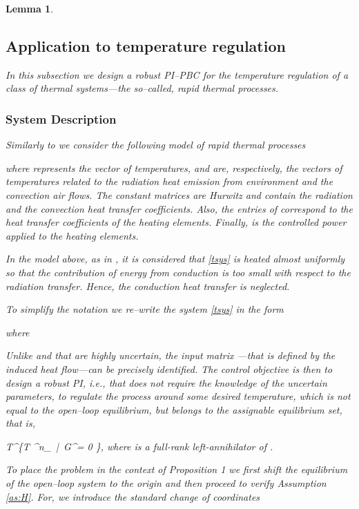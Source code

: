 \documentclass[10pt, conference]{ieeeconf}
\newtheorem{lemma}{Lemma}
\def\rea{\mathbb{R}}
\def\begequ{}
\def\lab{\label}
\begin{document}
\begin{lemma}
\subsection{Application to temperature regulation}
\lab{subsec62}	
In this subsection we design a robust PI--PBC for the temperature regulation of a class of thermal systems---the so--called, rapid thermal processes.
\subsubsection{System Description}
Similarly to \cite{ebert2004model, schaper1992modeling} we consider the following model of rapid thermal processes
 
where   represents the vector of temperatures,  and    are, respectively, the vectors of temperatures related to the radiation heat emission from environment and the convection air flows. 
The constant matrices   are {\em Hurwitz}  and contain the radiation and the convection heat transfer coefficients. Also, the entries of   correspond to the heat transfer coefficients of the heating elements. Finally,  is the controlled power applied to the heating elements. 

In the model above, as in \cite{schaper1992modeling}, it is considered that  \eqref{tsys}  is heated almost uniformly so that the contribution of energy from conduction is too small with respect to the radiation transfer. Hence, the conduction heat transfer is neglected. 

To simplify the notation we re--write the system \eqref{tsys} in the form 

where

Unlike   and  that are highly uncertain, the input matrix ---that is defined by the induced heat flow---can be precisely identified. The {\em control objective} is then to design a robust PI, {\em i.e.}, that does not require the knowledge of  the uncertain parameters, to regulate the process around some desired temperature, which is {\em not equal} to the open--loop equilibrium, but belongs to the assignable equilibrium set, that is,
\begequ
\lab{tsta}
T^\star \in \left\{T \in \rea^n_{}\ |\ G^\perp [A_1 \Psi(T)+A_2 T + E] = 0 \right\},
\endequ
where  is a full-rank left-annihilator of .

To place the problem in the context of Proposition 1 we first shift the equilibrium of the open--loop system to the origin and then proceed to verify Assumption \ref{as:H}. For, we  introduce the standard change of coordinates


\end{lemma}
\end{document}
